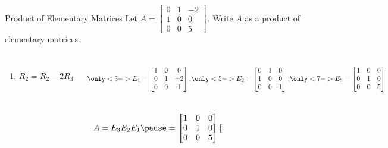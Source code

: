 \documentclass[xcoler=dvipsnames, aspectratio=169]{beamer}
\begin{document}
    \begin{frame}{Product of Elementary Matrices}
        \small
        Let $A = \begin{bmatrix}0&1&-2\\1&0&0\\0&0&5\end{bmatrix}$. Write $A$ as a product of
            elementary matrices.\pause
            \begin{columns}
                    \begin{enumerate}
                        \item $R_2 = R_2 - 2R_3$
                    \end{enumerate}
                \[
                    \only<3->{
                    E_1 = \begin{bmatrix}
                        1&0&0\\
                        0&1&-2\\
                        0&0&1
                    \end{bmatrix},} 
                    \only<5->{E_2 = \begin{bmatrix}
                        0 & 1 & 0\\
                        1 & 0 & 0\\
                        0 & 0 & 1
                    \end{bmatrix},}
                    \only<7->{E_3 = \begin{bmatrix}
                        1&0&0\\
                        0&1&0\\
                        0&0&5
                    \end{bmatrix}}
                \]
            \end{columns}
            \pause\pause\pause\pause\pause\pause
            \[
                A=E_3E_2E_1\pause =\begin{bmatrix}
                        1&0&0\\
                        0&1&0\\
                        0&0&5
                    \end{bmatrix}\begin{bmatrix}

\end{bmatrix}\]
\end{frame}
\end{document}

